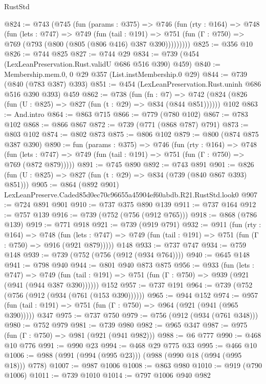 \begin{lexlean}{RustStd}
\begin{coremodule}
@824 := @743
    (@745
      (fun (params : @375) =>
      @746
        (fun (rty : @164) =>
        @748
          (fun (lets : @747) =>
          @749
            (fun (tail : @191) =>
            @751 (fun (Γ : @750) => @769 (@793 (@800 (@805 (@806 @416) @387 @390)))))))))
@825 := @356 @10
@826 := @744 @825
@827 := @744 @29
@834 := @739 (@454 (LexLeanPreservation.Rust.validU @686 @516 @390) @459)
@840 := Membership.mem.{0, 0} @29 @357 (List.instMembership.{0} @29)
@844 := @739 (@840 (@783 @387) @393)
@851 := @454 (LexLeanPreservation.Rust.uninh @686 @516 @390 @393) @459
@862 := @738
    (fun (fn : @7) =>
    @742 (@824 (@826 (fun (U : @825) => @827 (fun (t : @29) => @834 (@844 @851))))))
    @102
@863 := And.intro
@864 := @863 @715
@866 := @779 (@780 @102)
@867 := @783 @102
@868 := @866 @867
@872 := @739 (@771 (@868 @787) @791)
@873 := @803 @102
@874 := @802 @873
@875 := @806 @102
@879 := @800 (@874 @875 @387 @390)
@890 := fun (params : @375) =>
  @746
    (fun (rty : @164) =>
    @748
      (fun (lets : @747) => @749 (fun (tail : @191) => @751 (fun (Γ : @750) => @769 (@872 @879)))))
@891 := @745 @890
@892 := @743 @891
@901 := @826 (fun (U : @825) => @827 (fun (t : @29) => @834 (@739 (@840 @867 @393) @851)))
@905 := @864 (@892 @901) LexLeanPreserve.Caded85d0ec70c96655a45904ef60abdb.R21.RustStd.look0
@907 := @724 @891 @901
@910 := @737 @375 @890 @139
@911 := @737 @164
@912 := @757 @139
@916 := @739 (@752 (@756 (@912 @765)))
@918 := @868 (@786 @139)
@919 := @771 @918
@921 := @739 (@919 @791)
@932 := @911
    (fun (rty : @164) =>
    @748
      (fun (lets : @747) => @749 (fun (tail : @191) => @751 (fun (Γ : @750) => @916 (@921 @879)))))
    @148
@933 := @737 @747
@934 := @759 @148
@939 := @739 (@752 (@756 (@912 (@934 @764))))
@940 := @645 @148
@941 := @798 @940
@944 := @801 @940 @873 @875
@956 := @933
    (fun (lets : @747) =>
    @749 (fun (tail : @191) => @751 (fun (Γ : @750) => @939 (@921 (@941 (@944 @387 @390))))))
    @152
@957 := @737 @191
@964 := @739 (@752 (@756 (@912 (@934 (@761 (@153 @390))))))
@965 := @944 @152
@974 := @957 (fun (tail : @191) => @751 (fun (Γ : @750) => @964 (@921 (@941 (@965 @390))))) @347
@975 := @737 @750
@979 := @756 (@912 (@934 (@761 @348)))
@980 := @752 @979
@981 := @739 @980
@982 := @965 @347
@987 := @975 (fun (Γ : @750) => @981 (@921 (@941 @982)))
@988 := @6 @777
@990 := @468 @10 @776
@991 := @990 @23
@994 := @468 @29 @775 @33
@995 := @466 @10
@1006 := @988 (@991 (@994 (@995 @23))) (@988 (@990 @18 (@994 (@995 @18))) @778)
@1007 := @987 @1006
@1008 := @863 @980
@1010 := @919 (@790 @1006)
@1011 := @739 @1010
@1014 := @797 @1006 @940 @982

\end{coremodule}
\end{lexlean}
